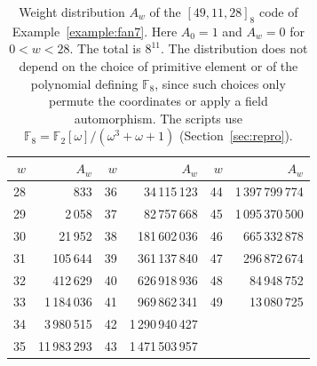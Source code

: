 \documentclass[12pt,letterpaper]{article}
\numberwithin{equation}{section}
\theoremstyle{definition}
\theoremstyle{remark}
\newcommand{\F}{\mathbb{F}}
\begin{document}
\begin{table}[ht]
\centering
\caption{Weight distribution $A_w$ of the $[49,11,28]_8$ code of
Example~\ref{example:fan7}. Here $A_0=1$ and $A_w=0$ for $0<w<28$. The total is
$8^{11}$. The distribution does not depend on the choice of primitive element
or of the polynomial defining $\F_8$, since such choices only permute the
coordinates or apply a field automorphism. The scripts use
$\F_8=\F_2[\omega]/(\omega^3+\omega+1)$ (Section~\ref{sec:repro}).}\label{tab:wd}
\small
\begin{tabular}{@{}rrrrrr@{}}
\toprule
$w$ & $A_w$ & $w$ & $A_w$ & $w$ & $A_w$\\
\midrule
28 & 833 & 36 & 34\,115\,123 & 44 & 1\,397\,799\,774\\
29 & 2\,058 & 37 & 82\,757\,668 & 45 & 1\,095\,370\,500\\
30 & 21\,952 & 38 & 181\,602\,036 & 46 & 665\,332\,878\\
31 & 105\,644 & 39 & 361\,137\,840 & 47 & 296\,872\,674\\
32 & 412\,629 & 40 & 626\,918\,936 & 48 & 84\,948\,752\\
33 & 1\,184\,036 & 41 & 969\,862\,341 & 49 & 13\,080\,725\\
34 & 3\,980\,515 & 42 & 1\,290\,940\,427 & & \\
35 & 11\,983\,293 & 43 & 1\,471\,503\,957 & & \\
\bottomrule
\end{tabular}
\end{table}
\end{document}
